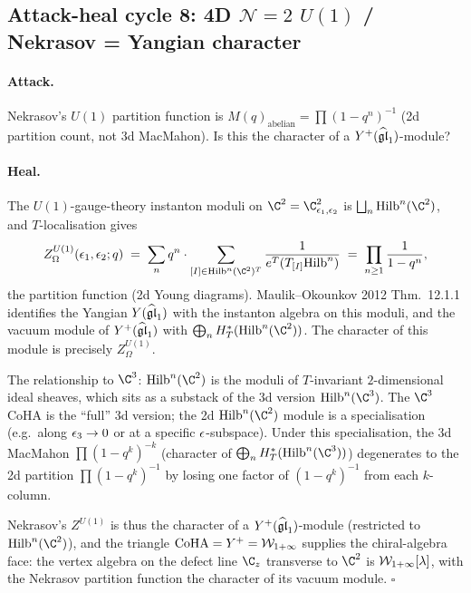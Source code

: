 \subsection{Attack-heal cycle 8: 4D $\mathcal{N} = 2$ $U(1)$ / Nekrasov = Yangian character}
\label{opus:sec:ah-8-nekrasov}

\paragraph{Attack.}
Nekrasov's $U(1)$ partition function is $M(q)_{\mathrm{abelian}} = \prod(1 - q^n)^{-1}$
(2d partition count, not 3d MacMahon). Is this the character of a $Y^+(\widehat{\mathfrak{gl}}_1)$-module?

\paragraph{Heal.}
The $U(1)$-gauge-theory instanton moduli on $\C^2 = \C^2_{\eps_1, \eps_2}$ is
$\bigsqcup_n \Hilb^n(\C^2)$, and $T$-localisation gives
\[
 Z^{U(1)}_{\Omega}(\eps_1, \eps_2; q) \;=\; \sum_n q^n \cdot \sum_{[I] \in \Hilb^n(\C^2)^T}
 \frac{1}{e^T(T_{[I]}\Hilb^n)}
 \;=\; \prod_{n \geq 1} \frac{1}{1 - q^n},
\]
the partition function (2d Young diagrams). Maulik--Okounkov 2012 Thm.~12.1.1 identifies
the Yangian $Y(\widehat{\mathfrak{gl}}_1)$ with the instanton algebra on this moduli, and the vacuum module
of $Y^+(\widehat{\mathfrak{gl}}_1)$ with $\bigoplus_n H^*_T(\Hilb^n(\C^2))$. The character of this module
is precisely $Z^{U(1)}_{\Omega}$.

The relationship to $\C^3$: $\Hilb^n(\C^2)$ is the moduli of $T$-invariant $2$-dimensional
ideal sheaves, which sits as a substack of the 3d version $\Hilb^n(\C^3)$. The $\C^3$
CoHA is the ``full'' 3d version; the 2d $\Hilb^n(\C^2)$ module is a specialisation
(e.g.\ along $\epsilon_3 \to 0$ or at a specific $\epsilon$-subspace). Under this specialisation,
the 3d MacMahon $\prod(1 - q^k)^{-k}$ (character of $\bigoplus_n H^*_T(\Hilb^n(\C^3))$)
degenerates to the 2d partition $\prod(1 - q^k)^{-1}$ by losing one factor of $(1 - q^k)^{-1}$
from each $k$-column.

Nekrasov's $Z^{U(1)}$ is thus the character of a $Y^+(\widehat{\mathfrak{gl}}_1)$-module (restricted to
$\Hilb^n(\C^2)$), and the triangle $\mathrm{CoHA} = Y^+ = \mathcal{W}_{1+\infty}$ supplies the chiral-algebra
face: the vertex algebra on the defect line $\C_z$ transverse to $\C^2$ is $\mathcal{W}_{1+\infty}[\lambda]$,
with the Nekrasov partition function the character of its vacuum module.
\hfill$\square$

